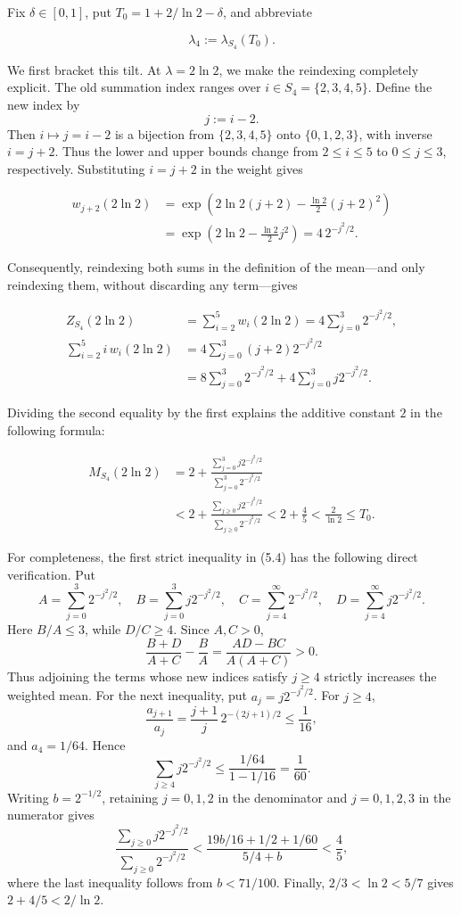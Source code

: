 \documentclass[11pt,reqno]{amsart}
\begin{document}
Fix \(\delta\in[0,1]\), put
\(T_0=1+2/{\ln 2}-\delta\), and abbreviate

\[
 \lambda_4:=\lambda_{S_4}(T_0).
\]

We first bracket this tilt.  At \(\lambda=2{\ln 2}\), we make the
reindexing completely explicit.  The old summation index ranges over
\(i\in S_4=\{2,3,4,5\}\).  Define the new index by
\[
 j:=i-2.
\]
Then \(i\mapsto j=i-2\) is a bijection from
\(\{2,3,4,5\}\) onto \(\{0,1,2,3\}\), with inverse
\(i=j+2\).  Thus the lower and upper bounds change from
\(2\le i\le5\) to \(0\le j\le3\), respectively.  Substituting
\(i=j+2\) in the weight gives

\[
\begin{aligned}
 w_{j+2}(2{\ln 2})
 &=\exp\!\left(2{\ln 2}(j+2)
       -\frac{{\ln 2}}2(j+2)^2\right)\\
 &=\exp\!\left(2{\ln 2}-\frac{{\ln 2}}2j^2\right)
 =4\,2^{-j^2/2}.
\end{aligned}
\]

Consequently, reindexing both sums in the definition of the mean---and
only reindexing them, without discarding any term---gives

\[
\begin{aligned}
 Z_{S_4}(2{\ln 2})
 &=\sum_{i=2}^{5}w_i(2{\ln 2})
   =4\sum_{j=0}^{3}2^{-j^2/2},\\
 \sum_{i=2}^{5}i\,w_i(2{\ln 2})
 &=4\sum_{j=0}^{3}(j+2)2^{-j^2/2}\\
 &=8\sum_{j=0}^{3}2^{-j^2/2}
   +4\sum_{j=0}^{3}j2^{-j^2/2}.
\end{aligned}
\]

Dividing the second equality by the first explains the additive
constant \(2\) in the following formula:

\[
 \begin{aligned}
 M_{S_4}(2{\ln 2})
 &=2+\frac{\sum_{j=0}^{3}j2^{-j^2/2}}
          {\sum_{j=0}^{3}2^{-j^2/2}}\\
 &<2+\frac{\sum_{j\ge0}j2^{-j^2/2}}
          {\sum_{j\ge0}2^{-j^2/2}}
 <2+\frac45<\frac2{\ln 2}\le T_0.
 \end{aligned}
 \tag{5.4}
\]

For completeness, the first strict inequality in (5.4) has the following
direct verification.  Put
\[
 A=\sum_{j=0}^{3}2^{-j^2/2},\quad
 B=\sum_{j=0}^{3}j2^{-j^2/2},\quad
 C=\sum_{j=4}^{\infty}2^{-j^2/2},\quad
 D=\sum_{j=4}^{\infty}j2^{-j^2/2}.
\]
Here \(B/A\le3\), while \(D/C\ge4\).  Since \(A,C>0\),
\[
 \frac{B+D}{A+C}-\frac BA
 =\frac{AD-BC}{A(A+C)}>0.
\]
Thus adjoining the terms whose new indices satisfy \(j\ge4\) strictly
increases the weighted mean. For the next inequality, put
\(a_j=j2^{-j^2/2}\). For \(j\ge4\),
\[
 \frac{a_{j+1}}{a_j}
 =\frac{j+1}{j}\,2^{-(2j+1)/2}\le\frac1{16},
\]
and \(a_4=1/64\). Hence
\[
 \sum_{j\ge4}j2^{-j^2/2}
 \le\frac{1/64}{1-1/16}=\frac1{60}.
\]
Writing \(b=2^{-1/2}\), retaining \(j=0,1,2\) in the denominator and
\(j=0,1,2,3\) in the numerator gives
\[
 \frac{\sum_{j\ge0}j2^{-j^2/2}}
      {\sum_{j\ge0}2^{-j^2/2}}
 <\frac{19b/16+1/2+1/60}{5/4+b}<\frac45,
\]
where the last inequality follows from \(b<71/100\). Finally,
\(2/3<\ln 2<5/7\) gives \(2+4/5<2/\ln 2\).
\end{document}
